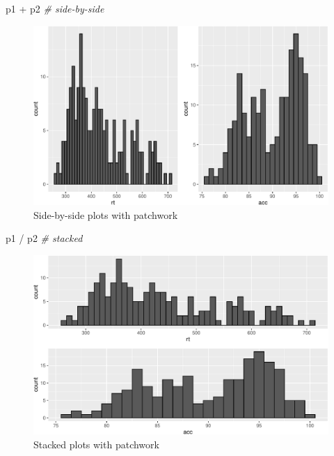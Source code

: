 \documentclass[
  english,
  doc,floatsintext]{apa6}
\newenvironment{Shaded}{\begin{snugshade}}{\end{snugshade}}
\newcommand{\CommentTok}[1]{\textcolor[rgb]{0.56,0.35,0.01}{\textit{#1}}}
\newcommand{\NormalTok}[1]{#1}
\newcommand{\SpecialCharTok}[1]{\textcolor[rgb]{0.00,0.00,0.00}{#1}}
\begin{document}
\begin{Shaded}
\begin{Highlighting}[]
\NormalTok{p1 }\SpecialCharTok{+}\NormalTok{ p2 }\CommentTok{\# side{-}by{-}side}
\end{Highlighting}
\end{Shaded}

\begin{figure}

{\centering \includegraphics[width=1\linewidth]{images/patchwork-side-1} 

}

\caption{Side-by-side plots with patchwork}\label{fig:patchwork-side}
\end{figure}

\begin{Shaded}
\begin{Highlighting}[]
\NormalTok{p1 }\SpecialCharTok{/}\NormalTok{ p2 }\CommentTok{\# stacked}
\end{Highlighting}
\end{Shaded}

\begin{figure}

{\centering \includegraphics[width=1\linewidth]{images/patchwork-stack-1} 

}

\caption{Stacked plots with patchwork}\label{fig:patchwork-stack}
\end{figure}
\end{document}
